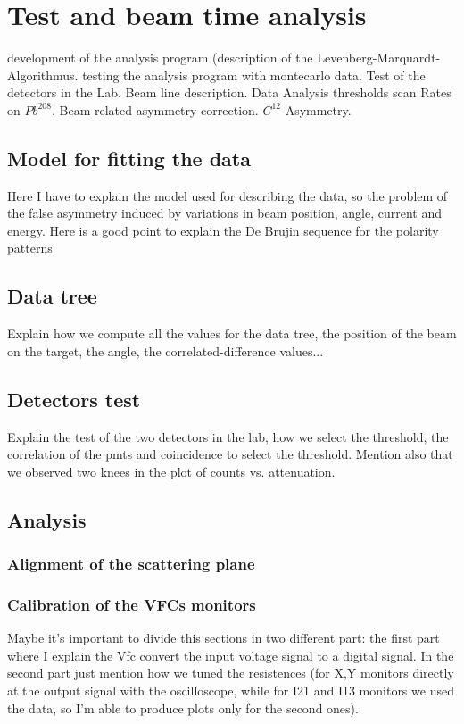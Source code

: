 \chapter{Test and beam time analysis} \label{analysis}

\begin{outline}[enumerate]
\1 development of the analysis program (description of the Levenberg-Marquardt-Algorithmus.
\1 testing the analysis program with montecarlo data.
\1 Test of the detectors in the Lab.
\1 Beam line description.
\1 Data Analysis
	\2 thresholds scan
	\2 Rates on $Pb^{208}$.
	\2 Beam related asymmetry correction.
	\2 $C^{12}$ Asymmetry.
\end{outline}

\section{Model for fitting the data}
Here I have to explain the model used for describing the data, so the problem of the false asymmetry induced by variations in beam position, angle, current and energy. Here is a good point to explain the De Brujin sequence for the polarity patterns

\section{Data tree}
Explain how we compute all the values for the data tree, the position of the beam on the target, the angle, the correlated-difference values...

\section{Detectors test}
Explain the test of the two detectors in the lab, how we select the threshold, the correlation of the pmts and coincidence to select the threshold. Mention also that we observed two knees in the plot of counts vs. attenuation.

\section{Analysis}

\subsection{Alignment of the scattering plane}

\subsection{Calibration of the VFCs monitors}
Maybe it's important to divide this sections in two different part: the first part where I explain the Vfc convert the input voltage signal to a digital signal. In the second part just mention how we tuned the resistences (for X,Y monitors directly at the output signal with the oscilloscope, while for I21 and I13 monitors we used the data, so I'm able to produce plots only for the second ones).

